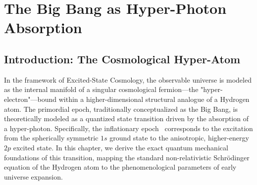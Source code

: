 \section{The Big Bang as Hyper-Photon Absorption}

\subsection{Introduction: The Cosmological Hyper-Atom}
In the framework of Excited-State Cosmology, the observable universe is modeled as the internal manifold of a singular cosmological fermion---the "hyper-electron"---bound within a higher-dimensional structural analogue of a Hydrogen atom. The primordial epoch, traditionally conceptualized as the Big Bang, is theoretically modeled as a quantized state transition driven by the absorption of a hyper-photon. Specifically, the inflationary epoch~\cite{Guth1981} corresponds to the excitation from the spherically symmetric $1s$ ground state to the anisotropic, higher-energy $2p$ excited state. In this chapter, we derive the exact quantum mechanical foundations of this transition, mapping the standard non-relativistic Schr\"odinger equation of the Hydrogen atom to the phenomenological parameters of early universe expansion. \cite{Hubble1929, Spergel2003, Rubin1980}

